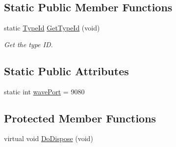 \subsection*{Static Public Member Functions}
\begin{DoxyCompactItemize}
\item 
static \hyperlink{classns3_1_1TypeId}{Type\+Id} \hyperlink{classns3_1_1BsmApplication_a70150473fba93a7988d1edd41ab153df}{Get\+Type\+Id} (void)
\begin{DoxyCompactList}\small\item\em Get the type ID. \end{DoxyCompactList}\end{DoxyCompactItemize}
\subsection*{Static Public Attributes}
\begin{DoxyCompactItemize}
\item 
static int \hyperlink{classns3_1_1BsmApplication_a93a6ddc889084ac867d99cfe94e092d2}{wave\+Port} = 9080
\end{DoxyCompactItemize}
\subsection*{Protected Member Functions}
\begin{DoxyCompactItemize}
\item 
virtual void \hyperlink{classns3_1_1BsmApplication_ac3e2c412d85bd266a9da9bf56c6e418a}{Do\+Dispose} (void)
\end{DoxyCompactItemize}
